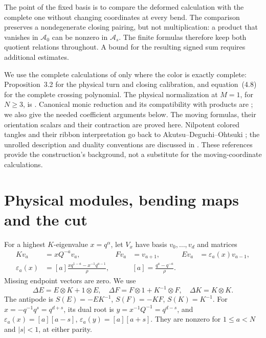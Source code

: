 \documentclass[11pt]{article}
\numberwithin{equation}{section}
\theoremstyle{definition}\newtheorem{definition}[theorem]{Definition}
\theoremstyle{remark}\newtheorem{remark}[theorem]{Remark}
\newcommand{\Acal}{\mathcal A}
\begin{document}
The point of the fixed basis is to compare the deformed calculation
with the complete one without changing coordinates at every bend.
The comparison preserves a nondegenerate closing pairing, but not
multiplication: a product that vanishes in $\Acal_0$ can be nonzero
in $\Acal_s$. The finite formulas therefore keep both quotient
relations throughout. A bound for the resulting signed sum requires
additional estimates.

We use the complete calculations of \cite{Newton} only where the color
is exactly complete: Proposition~3.2 for the physical turn and closing
calibration, and equation~(4.8)
for the complete crossing polynomial. The physical normalization at
$M=1$, for $N\ge3$, is \cite[Theorem~10.1]{Finite}. Canonical monic reduction and its
compatibility with products are \cite[Propositions~2.1--2.2]{Finite};
we also give the needed coefficient arguments below. The moving
formulas, their orientation scalars and their contraction are proved
here. Nilpotent colored tangles and their ribbon interpretation go
back to Akutsu--Deguchi--Ohtsuki \cite{ADO}; the unrolled description
and duality conventions are discussed in \cite{CGP}. These references
provide the construction's background, not a substitute for the
moving-coordinate calculations.

\section{Physical modules, bending maps and the cut}
For a highest $K$-eigenvalue $x=q^\alpha$, let $V_x$ have basis $v_0,\ldots,v_d$
and matrices
\begin{equation}\label{mt:module}
 \begin{aligned}
 Kv_a&=xQ^{-a}v_a,& Fv_a&=v_{a+1},& Ev_a&=\varepsilon_a(x)v_{a-1},\\
 \varepsilon_a(x)&=[a]\frac{xq^{1-a}-x^{-1}q^{a-1}}{\rho},&&
 [a]=\frac{q^a-q^{-a}}\rho.
\end{aligned}
\end{equation}
Missing endpoint vectors are zero. We use
\[
 \Delta E=E\otimes K+1\otimes E,\quad
 \Delta F=F\otimes1+K^{-1}\otimes F,\quad
 \Delta K=K\otimes K.
\]
The antipode is $S(E)=-EK^{-1}$, $S(F)=-KF$, $S(K)=K^{-1}$.
For $x=-q^{-1}q^s=q^{d+s}$, its dual root is
$y=x^{-1}Q^{-1}=q^{d-s}$, and
$\varepsilon_a(x)=[a][a-s]$, $\varepsilon_a(y)=[a][a+s]$.
They are nonzero for $1\le a<N$ and $|s|<1$, at either parity.
\end{document}
